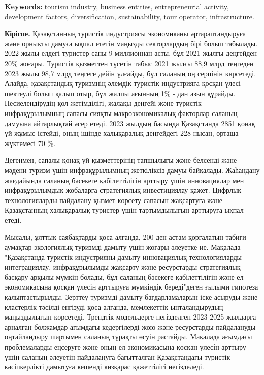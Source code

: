 {\bfseries Keywords:} tourism industry, business entities, entrepreneurial
activity, development factors, diversification, sustainability, tour
operator, infrastructure.
\begin{multicols}{2}


{\bfseries Кіріспе.} Қазақстанның туристік индустриясы экономиканы
әртараптандыруға және орнықты дамуға ықпал ететін маңызды секторлардың
бірі болып табылады. 2022 жылы елдегі туристер саны 9 миллионнан асты,
бұл 2021 жылғы деңгейден 20\% жоғары. Туристік қызметтен түсетін табыс
2021 жылғы 88,9 млрд теңгеден 2023 жылы 98,7 млрд теңгеге дейін ұлғайды,
бұл саланың оң серпінін көрсетеді. Алайда, қазақстандық туризмнің
әлемдік туристік индустрияға қосқан үлесі шектеулі болып қалып отыр, бұл
жалпы ағынның 1\% - дан азын құрайды. Несиелендірудің қол жетімділігі,
жалақы деңгейі және туристік инфрақұрылымның сапасы сияқты
макроэкономикалық факторлар саланың дамуына айтарлықтай әсер етеді. 2023
жылдың басында Қазақстанда 2851 қонақ үй жұмыс істейді, оның ішінде
халықаралық деңгейдегі 228 нысан, орташа жүктемесі 70 \%.

Дегенмен, сапалы қонақ үй қызметтерінің тапшылығы және белсенді және
мәдени туризм үшін инфрақұрылымның жеткіліксіз дамуы байқалады.
Жаһандану жағдайында саланың бәсекеге қабілеттілігін арттыру үшін
инновациялар мен инфрақұрылымдық жобаларға стратегиялық инвестициялау
қажет. Цифрлық технологияларды пайдалану қызмет көрсету сапасын
жақсартуға және Қазақстанның халықаралық туристер үшін тартымдылығын
арттыруға ықпал етеді.

Мысалы, ұлттық саябақтарды қоса алғанда, 200-ден астам қорғалатын табиғи
аумақтар экологиялық туризмді дамыту үшін жоғары әлеуетке ие. Мақалада
"Қазақстанда туристік индустрияны дамыту инновациялық технологияларды
интеграциялау, инфрақұрылымды жақсарту және ресурстарды стратегиялық
басқару арқылы мүмкін болады, бұл саланың бәсекеге қабілеттілігін және
ел экономикасына қосқан үлесін арттыруға мүмкіндік береді"деген ғылыми
гипотеза қалыптастырылды. Зерттеу туризмді дамыту бағдарламаларын іске
асыруды және кластерлік тәсілді енгізуді қоса алғанда, мемлекеттік
ынталандырудың маңыздылығын көрсетеді. Трендтік модельдерге негізделген
2023-2025 жылдарға арналған болжамдар ағымдағы кедергілерді жою және
ресурстарды пайдалануды оңтайландыру шартымен саланың тұрақты өсуін
растайды. Мақалада ағымдағы проблемаларды еңсеруге және оның ел
экономикасына қосқан үлесін арттыру үшін саланың әлеуетін пайдалануға
бағытталған Қазақстандағы туристік кәсіпкерлікті дамытуға кешенді
көзқарас қажеттілігі негізделеді.


\end{multicols}

